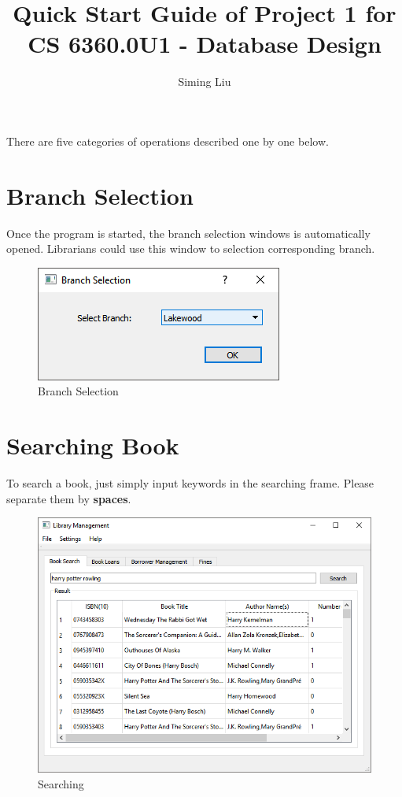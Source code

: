 \documentclass[a4paper, 12pt]{report}
\begin{document}
\title{Quick Start Guide of Project 1 for CS 6360.0U1 - Database Design}

\author{Siming Liu}

\maketitle{}

\noindent There are five categories of operations described one by one below.

\section*{Branch Selection}

Once the program is started, the branch selection windows is automatically opened. Librarians could use this window to selection corresponding branch.
\begin{figure}[H]
  \includegraphics[scale=0.8]{./screenshot/branch_selection.png}
  \caption{Branch Selection}
\end{figure}

\pagebreak

\section*{Searching Book}
To search a book, just simply input keywords in the searching frame. Please separate them by \textbf{spaces}.
\begin{figure}[H]
  \includegraphics[width=\textwidth, inner]{./screenshot/searching.png}
  \caption{Searching}
\end{figure}
\end{document}
